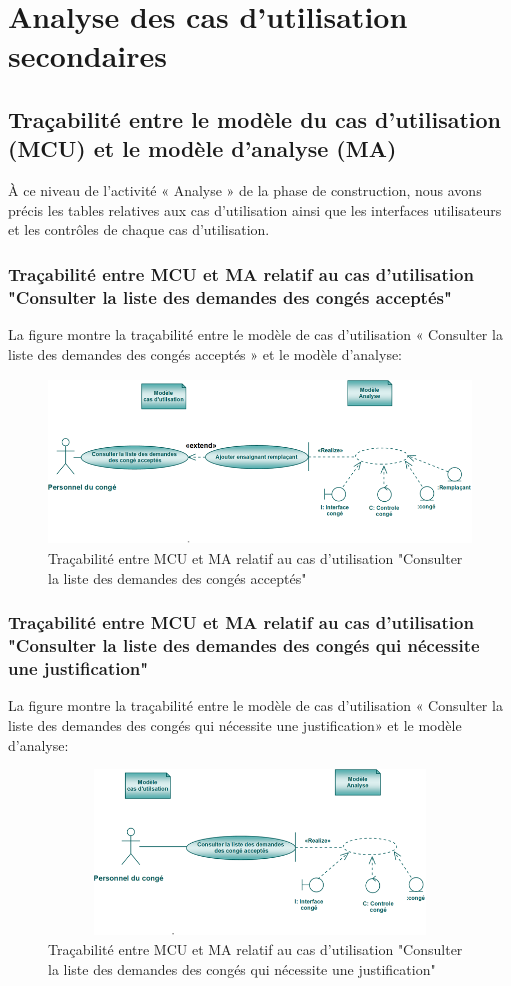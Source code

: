 \documentclass[12 pt]{report}
\begin{document}
\section{Analyse des cas d’utilisation secondaires }
\subsection{Traçabilité entre le modèle du cas d’utilisation (MCU) et le modèle d’analyse (MA)}
 À ce niveau de l’activité « Analyse » de la phase de construction, nous avons précis les tables relatives aux cas d’utilisation ainsi que les interfaces utilisateurs et les contrôles de chaque cas d’utilisation.
\subsubsection{Traçabilité entre MCU et MA relatif au cas d’utilisation "Consulter la liste des demandes des congés acceptés"}
La figure  montre la traçabilité entre le modèle de cas d’utilisation « Consulter la liste des demandes des congés acceptés » et le modèle d’analyse:
\begin{figure}[h]
\begin{center}
\includegraphics[width= 12cm , height =4.4cm]{tra_con_con_acc.PNG}
\caption{Traçabilité entre MCU et MA relatif au cas d’utilisation "Consulter la liste des demandes des congés acceptés"}
\end{center}
\end{figure}
\subsubsection{Traçabilité entre MCU et MA relatif au cas d’utilisation "Consulter la liste des demandes des congés qui nécessite une justification" }
La figure  montre la traçabilité entre le modèle de cas d’utilisation « Consulter la liste des demandes des congés qui nécessite une justification» et le modèle d’analyse:
\begin{figure}[h]
\begin{center}
\includegraphics[width= 12cm , height =4.4cm]{tra_con_con_jus.PNG}
\caption{Traçabilité entre MCU et MA relatif au cas d’utilisation "Consulter la liste des demandes des congés qui nécessite une justification"}
\end{center}
\end{figure}
\end{document}

